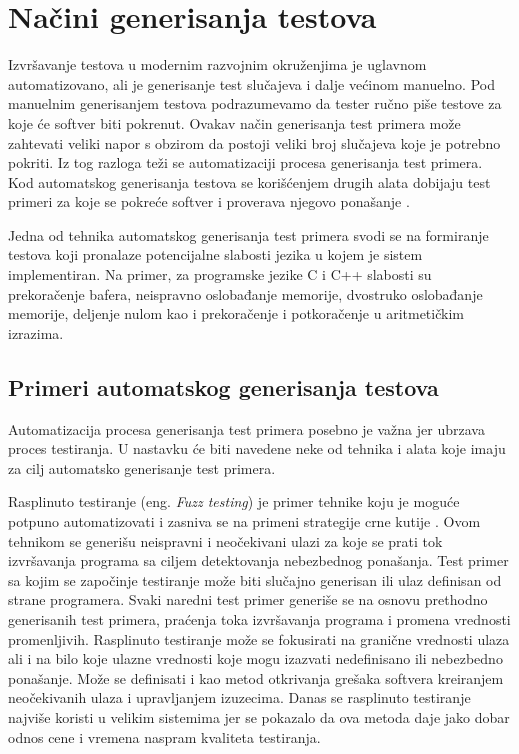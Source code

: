 \documentclass[12pt,oneside]{memoir}
\begin{document}
\section{Načini generisanja testova} \label{broj5}

Izvršavanje testova u modernim razvojnim okruženjima je uglavnom automatizovano, ali je generisanje test slučajeva i dalje većinom manuelno. Pod manuelnim generisanjem testova podrazumevamo da tester ručno piše testove za koje će softver biti pokrenut. Ovakav način generisanja test primera može zahtevati veliki napor s obzirom da postoji veliki broj slučajeva koje je potrebno pokriti. Iz tog razloga teži se automatizaciji procesa generisanja test primera. Kod automatskog generisanja testova se korišćenjem drugih alata dobijaju test primeri za koje se pokreće softver i proverava njegovo ponašanje \cite{AutomatedTestGeneration}. \par
Jedna od tehnika automatskog generisanja test primera svodi se na formiranje testova koji pronalaze potencijalne slabosti jezika u kojem je sistem implementiran.
Na primer, za programske jezike C i C++ slabosti su prekoračenje bafera, neispravno oslobađanje memorije, dvostruko oslobađanje memorije, deljenje nulom kao i prekoračenje i potkoračenje u aritmetičkim izrazima.


\subsection{Primeri automatskog generisanja testova}
Automatizacija procesa generisanja test primera posebno je važna jer ubrzava proces testiranja. U nastavku će biti navedene neke od tehnika i alata koje imaju za cilj automatsko generisanje test primera. 


Rasplinuto testiranje (eng. \textit{Fuzz testing}) je primer tehnike koju je moguće potpuno automatizovati i zasniva se na primeni strategije crne kutije \cite{FuzzTestingForDummies}. Ovom tehnikom se generišu neispravni i neočekivani ulazi za koje se prati tok izvršavanja programa sa ciljem detektovanja nebezbednog ponašanja. Test primer sa kojim se započinje testiranje može biti slučajno generisan ili ulaz definisan od strane programera. Svaki naredni test primer generiše se na osnovu prethodno generisanih test primera, praćenja toka izvršavanja programa i promena vrednosti promenljivih. Rasplinuto testiranje može se fokusirati na granične vrednosti ulaza ali i na bilo koje ulazne vrednosti koje mogu izazvati nedefinisano ili nebezbedno ponašanje. Može se definisati i kao metod otkrivanja grešaka softvera kreiranjem neočekivanih ulaza i upravljanjem izuzecima. Danas se rasplinuto testiranje najviše koristi u velikim sistemima jer se pokazalo da ova metoda daje jako dobar odnos cene i vremena naspram kvaliteta testiranja. 
\par
\end{document}
